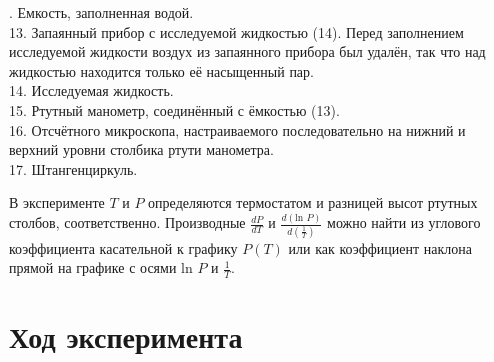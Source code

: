 \documentclass[a4paper,12pt]{article} %
\begin{document}
. Емкость, заполненная водой. \\
13. Запаянный прибор с исследуемой жидкостью (14). 
Перед заполнением исследуемой жидкости воздух из запаянного прибора был удалён, 
так что над жидкостью находится только её насыщенный пар. \\
14. Исследуемая жидкость.\\
15. Ртутный манометр, соединённый с ёмкостью (13). \\
16. Отсчётного микроскопа, настраиваемого последовательно на нижний и верхний 
уровни столбика ртути манометра. \\
17. Штангенциркуль.

\medskip 

\bigskip
В эксперименте $T$ и $P$ определяются термостатом и разницей высот ртутных столбов, соответственно. 
Производные $\frac{dP}{dT}$ и $\frac{d(\mbox{ln }P)}{d(\frac1T)}$ можно найти из углового коэффициента 
касательной к графику $P(T)$ или как коэффициент наклона прямой на графике с осями ln $P$ и $\frac1T$.

\section*{Ход эксперимента}
\end{document}
